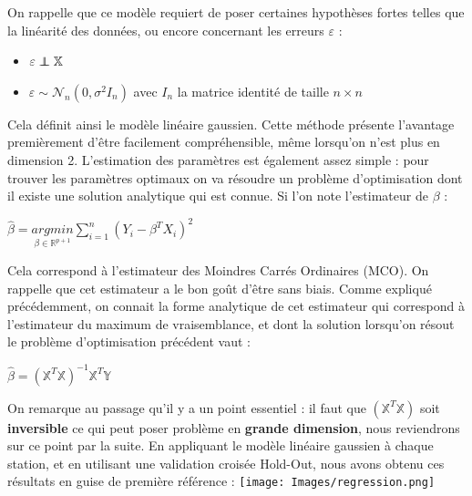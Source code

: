 \documentclass[14pt, openany]{article}
\newcommand\independent{\protect\mathpalette{\protect\independenT}{\perp}}
\def\independenT#1#2{\mathrel{\rlap{$#1#2$}\mkern2mu{#1#2}}}
\begin{document}
On rappelle que ce modèle requiert de poser certaines hypothèses fortes telles que la linéarité des données, ou encore concernant les erreurs $\varepsilon$ :
\begin{itemize}
\item $ \varepsilon \independent \mathbb{X}$
\item $\varepsilon \sim \mathcal{N}_n(0,\sigma^2I_n)$ avec $I_n$ la matrice identité de taille $n \times n$
\end{itemize}
Cela définit ainsi le modèle linéaire gaussien. Cette méthode présente l'avantage premièrement d'être facilement compréhensible, même lorsqu'on n'est plus en dimension 2. L'estimation des paramètres est également assez \og simple \fg{} : pour trouver les paramètres optimaux on va résoudre un problème d'optimisation dont il existe une solution analytique qui est connue. Si l'on note l'estimateur de $\beta$ : 
\begin{center}
$\hat{\beta} = \underset{\beta\in\mathbb{R}^{p+1} }{argmin}\sum\limits_{i=1}^n(Y_i-\beta^TX_i)^2$
\end{center}
Cela correspond à l'estimateur des Moindres Carrés Ordinaires (MCO). On rappelle que cet estimateur a le bon goût d'être sans biais. Comme expliqué précédemment, on connait la forme analytique de cet estimateur qui correspond à l'estimateur du maximum de vraisemblance, et dont la solution lorsqu'on résout le problème d'optimisation précédent vaut :
\begin{center}
$\hat{\beta} = (\mathbb{X}^T\mathbb{X})^{-1}\mathbb{X}^T\mathbb{Y}$
\end{center}
On remarque au passage qu'il y a un point essentiel : il faut que $(\mathbb{X}^T\mathbb{X})$ soit \textbf{inversible} ce qui peut poser problème en \textbf{grande dimension}, nous reviendrons sur ce point par la suite. En appliquant le modèle linéaire gaussien à chaque station, et en utilisant une validation croisée Hold-Out, nous avons obtenu ces résultats en guise de première référence :
\texttt{[image: Images/regression.png]}
\begin{center}
\label{fig1}
\end{center}
\end{document}
